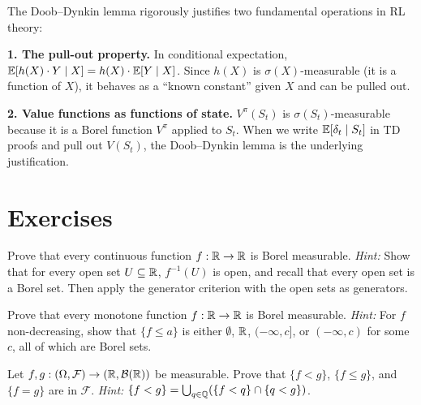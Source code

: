 \documentclass[11pt,a4paper]{article}
\begin{document}
\begin{rlconnection}[title={Connection to RL}]
The Doob--Dynkin lemma rigorously justifies two fundamental operations in
RL theory:

\textbf{1. The pull-out property.} In conditional expectation,
$\mathbb{E}[h(X) \cdot Y \mid X] = h(X) \cdot \mathbb{E}[Y \mid X]$. Since $h(X)$ is
$\sigma(X)$-measurable (it is a function of $X$), it behaves as a
``known constant'' given $X$ and can be pulled out.

\textbf{2. Value functions as functions of state.} $V^\pi(S_t)$ is
$\sigma(S_t)$-measurable because it is a Borel function $V^\pi$ applied
to $S_t$. When we write $\mathbb{E}[\delta_t \mid S_t]$ in TD proofs and pull
out $V(S_t)$, the Doob--Dynkin lemma is the underlying justification.
\end{rlconnection}


\section{Exercises}
\label{sec:exercises}

\begin{exercise}
\label{ex:continuous_measurable}
Prove that every continuous function $f: \mathbb{R} \to \mathbb{R}$ is Borel measurable.
\textit{Hint:} Show that for every open set $U \subseteq \mathbb{R}$,
$f^{-1}(U)$ is open, and recall that every open set is a Borel set.
Then apply the generator criterion with the open sets as generators.
\end{exercise}

\begin{exercise}
\label{ex:monotone_measurable}
Prove that every monotone function $f: \mathbb{R} \to \mathbb{R}$ is Borel measurable.
\textit{Hint:} For $f$ non-decreasing, show that $\{f \leq a\}$ is
either $\emptyset$, $\mathbb{R}$, $(-\infty, c]$, or $(-\infty, c)$ for some $c$,
all of which are Borel sets.
\end{exercise}

\begin{exercise}
\label{ex:measurable_sets}
Let $f, g: (\Omega, \mathcal{F}) \to (\mathbb{R}, \mathcal{B}(\mathbb{R}))$ be measurable.
Prove that $\{f < g\}$, $\{f \leq g\}$, and $\{f = g\}$ are in
$\mathcal{F}$.
\textit{Hint:} $\{f < g\} = \bigcup_{q \in \mathbb{Q}}
(\{f < q\} \cap \{q < g\})$.
\end{exercise}
\end{document}
